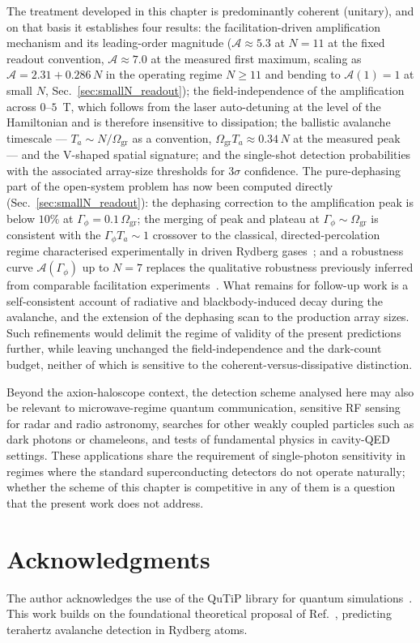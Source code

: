  The treatment developed in this chapter is predominantly coherent (unitary), and on that basis it establishes four results: the facilitation-driven amplification mechanism and its leading-order magnitude ($\mathcal{A}\approx5.3$ at $N=11$ at the fixed readout convention, $\mathcal{A}\approx7.0$ at the measured first maximum, scaling as $\mathcal{A}=2.31+0.286\,N$ in the operating regime $N \geq 11$ and bending to $\mathcal{A}(1)=1$ at small $N$, Sec.~\ref{sec:smallN_readout}); the field-independence of the amplification across $0$--$5$~T, which follows from the laser auto-detuning at the level of the Hamiltonian and is therefore insensitive to dissipation; the ballistic avalanche timescale --- $T_a\sim N/\Omega_{\mathrm{gr}}$ as a convention, $\Omega_{\mathrm{gr}}T_a\approx0.34\,N$ at the measured peak --- and the V-shaped spatial signature; and the single-shot detection probabilities with the associated array-size thresholds for $3\sigma$ confidence. The pure-dephasing part of the open-system problem has now been computed directly (Sec.~\ref{sec:smallN_readout}): the dephasing correction to the amplification peak is below $10\%$ at $\Gamma_\phi=0.1\,\Omega_{\mathrm{gr}}$; the merging of peak and plateau at $\Gamma_\phi\sim\Omega_{\mathrm{gr}}$ is consistent with the $\Gamma_\phi T_a\sim1$ crossover to the classical, directed-percolation regime characterised experimentally in driven Rydberg gases~\cite{Helmrich2020}; and a robustness curve $\mathcal{A}(\Gamma_\phi)$ up to $N=7$ replaces the qualitative robustness previously inferred from comparable facilitation experiments~\cite{Festa2022}. What remains for follow-up work is a self-consistent account of radiative and blackbody-induced decay during the avalanche, and the extension of the dephasing scan to the production array sizes. Such refinements would delimit the regime of validity of the present predictions further, while leaving unchanged the field-independence and the dark-count budget, neither of which is sensitive to the coherent-versus-dissipative distinction.

Beyond the axion-haloscope context, the detection scheme analysed here may also be relevant to microwave-regime quantum communication, sensitive RF sensing for radar and radio astronomy, searches for other weakly coupled particles such as dark photons or chameleons, and tests of fundamental physics in cavity-QED settings. These applications share the requirement of single-photon sensitivity in regimes where the standard superconducting detectors do not operate naturally; whether the scheme of this chapter is competitive in any of them is a question that the present work does not address.

\section*{Acknowledgments}

The author acknowledges the use of the QuTiP library for quantum simulations~\cite{Johansson2013,qutip5}. This work builds on the foundational theoretical proposal of Ref.~\cite{Nill2024}, predicting terahertz avalanche detection in Rydberg atoms.




